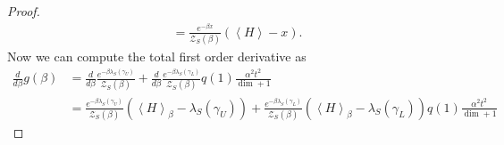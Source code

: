 \documentclass{article}
\newcommand{\parens}[1]{\left( #1 \right)}
\newcommand{\anglebrackets}[1]{\left< #1 \right>}
\newcommand{\partfun}{\mathcal{Z}}
\begin{document}
\begin{proof}
\begin{align}
        &= \frac{e^{-\beta x}}{\partfun_S(\beta)} \parens{\anglebrackets{H} - x}.
    \end{align}
    Now we can compute the total first order derivative as
    \begin{align}
        \frac{d}{d\beta} g(\beta) &= \frac{d}{d\beta} \frac{e^{-\beta \lambda_S(\gamma_U)}}{\partfun_S(\beta)} + \frac{d}{d\beta} \frac{e^{-\beta \lambda_S(\gamma_L)}}{\partfun_S(\beta)} q(1) \frac{\alpha^2 t^2}{\dim + 1} \\
        &= \frac{e^{-\beta \lambda_S(\gamma_U)}}{\partfun_S(\beta)}\parens{\anglebrackets{H}_{\beta} - \lambda_S(\gamma_U)} + \frac{e^{-\beta \lambda_S(\gamma_L)}}{\partfun_S(\beta)}\parens{\anglebrackets{H}_{\beta} - \lambda_S(\gamma_L)} q(1) \frac{\alpha^2 t^2}{\dim + 1}
    \end{align}

\end{proof}
\end{document}
